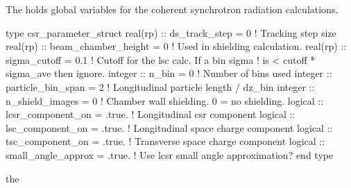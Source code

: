 {{{{{{{The  holds global variables for the coherent
synchrotron radiation calculations. 
\begin{example}
  type csr_parameter_struct
    real(rp) :: ds_track_step = 0          ! Tracking step size
    real(rp) :: beam_chamber_height = 0    ! Used in shielding calculation.
    real(rp) :: sigma_cutoff = 0.1         ! Cutoff for the lsc calc. If a bin sigma
                                           !  is < cutoff * sigma_ave then ignore.
    integer :: n_bin = 0                   ! Number of bins used
    integer :: particle_bin_span = 2       ! Longitudinal particle length / dz_bin
    integer :: n_shield_images = 0         ! Chamber wall shielding. 0 = no shielding.
    logical :: lcsr_component_on = .true.  ! Longitudinal csr component
    logical :: lsc_component_on = .true.   ! Longitudinal space charge component
    logical :: tsc_component_on = .true.   ! Transverse space charge component
    logical :: small_angle_approx = .true. ! Use lcsr small angle approximation?
  end type
\end{example}
the \vn{global%
See the Bmad manual for more details.

\section{Optimization Parameters}
\label{s:opt.params}
\index{Optimization!Parameters}

When the optimizer is run in \tao (using the \vn{run} command), The
optimizer, after it initializes itself, takes a number of
\vn{cycles}. Each cycle consists of changing the values of the
variables the optimizer is allowed to change. The number of steps that
the optimizer will take is determined by the parameter
\vn{global%
goes through \vn{global%
through one \vn{loop}. After going through through
\vn{global%
To immediately stop the optimizer the period key
\vn{``.''} may be pressed.

\section{Initializing Connected Universes}
\index{Initialization!Connected Universes}
\label{s:connected.uni}

}}}}}}}}}}}

